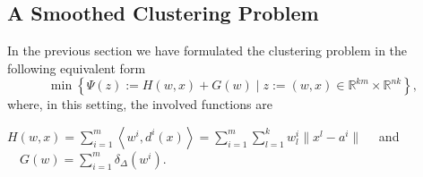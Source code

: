 \documentclass[11pt]{article}
\numberwithin{equation}{section}
\begin{document}
%


\subsection{A Smoothed Clustering Problem}

In the previous section we have formulated the clustering problem in the following equivalent form
\begin{equation*}
	\min \left\lbrace \Psi(z) := H(w,x) + G(w) \mid z := (w,x) \in \mathbb{R}^{km} \times \mathbb{R}^{nk} \right\rbrace ,
\end{equation*}
where, in this setting, the involved functions are
\begin{center}
$H(w,x) = \sum\limits_{i=1}^{m} \left\langle w^i , d^i(x) \right\rangle
	= \sum\limits_{i=1}^{m} \sum\limits_{l=1}^{k} w^i_l \| x^l - a^i \| \quad$
and 
$\quad G(w) = \sum\limits_{i=1}^{m} \delta_{\Delta}(w^i)$.
\end{center}
\end{document}
